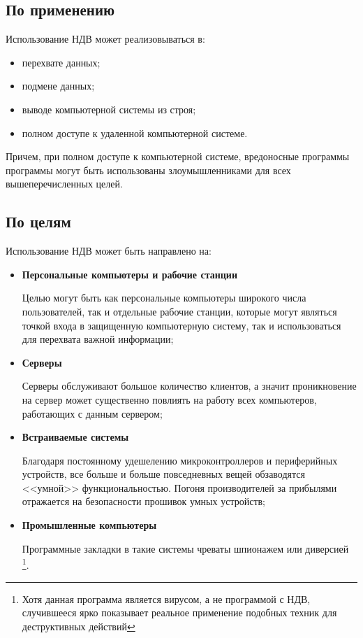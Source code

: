    \subsection{По применению}\label{sec:ch1/sec2/sub1}
    Использование НДВ может реализовываться в:
    \begin{itemize}
        \item перехвате данных;
        \item подмене данных;
        \item выводе компьютерной системы из строя;
        \item полном доступе к удаленной компьютерной системе.
    \end{itemize}
    Причем, при полном доступе к компьютерной системе, вредоносные программы
    программы могут быть использованы злоумышленниками для
    всех вышеперечисленных целей.

\subsection{По целям}\label{sec:ch1/sec2/sub2}
Использование НДВ может быть направлено на:
\begin{itemize}
    \item \textbf{Персональные компьютеры и рабочие станции}
          
          Целью могут быть как персональные компьютеры широкого числа пользователей,
          так и отдельные рабочие станции, которые могут являться точкой входа в
          защищенную компьютерную систему, так и использоваться для перехвата важной
          информации;
    \item \textbf{Серверы}
          
          Серверы обслуживают большое количество клиентов, а значит проникновение на
          сервер может существенно повлиять на работу всех компьютеров, работающих с
          данным сервером;
    \item \textbf{Встраиваемые системы}

          Благодаря постоянному удешелению микроконтроллеров и периферийных устройств,
          все больше и больше повседневных вещей обзаводятся <<умной>> функциональностью.
          Погоня производителей за прибылями отражается на безопасности прошивок умных устройств;
    \item \textbf{Промышленные компьютеры}

        Программные закладки в такие системы чреваты шпионажем или диверсией \autocite{stuxnet}
        \footnote{Хотя данная программа является вирусом, а не программой с НДВ, случившееся
        ярко показывает реальное применение подобных техник для деструктивных действий}.
\end{itemize}

